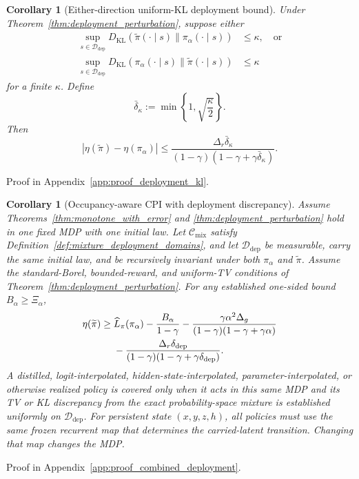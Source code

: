 \documentclass{article}
\theoremstyle{plain}
\newtheorem{corollary}[theorem]{Corollary}
\theoremstyle{definition}
\theoremstyle{remark}
\begin{document}
\begin{corollary}[Either-direction uniform-KL deployment bound]
\label{cor:deployment_pinsker}
Under Theorem~\ref{thm:deployment_perturbation}, suppose either
\begin{align*}
\sup_{s\in\mathcal D_{\mathrm{dep}}}
D_{\mathrm{KL}}\!\left(
\widetilde\pi(\cdot\mid s)\|\pi_\alpha(\cdot\mid s)\right)
&\le\kappa,
\quad\text{or}\\
\sup_{s\in\mathcal D_{\mathrm{dep}}}
D_{\mathrm{KL}}\!\left(
\pi_\alpha(\cdot\mid s)\|\widetilde\pi(\cdot\mid s)\right)
&\le\kappa
\end{align*}
for a finite $\kappa$. Define
\begin{equation}
\bar\delta_\kappa:=\min\left\{1,\sqrt{\frac{\kappa}{2}}\right\}.
\label{eq:deployment_pinsker_radius}
\end{equation}
Then
\begin{equation}
\left|\eta(\widetilde\pi)-\eta(\pi_\alpha)\right|
\le
\frac{\Delta_r\bar\delta_\kappa}
{(1-\gamma)(1-\gamma+\gamma\bar\delta_\kappa)}.
\label{eq:deployment_kl_bound}
\end{equation}
\end{corollary}
Proof in Appendix~\ref{app:proof_deployment_kl}.

\begin{corollary}[Occupancy-aware CPI with deployment discrepancy]
\label{cor:combined_cpi_deployment}
Assume Theorems~\ref{thm:monotone_with_error} and
\ref{thm:deployment_perturbation} hold in one fixed MDP with one initial law.
Let $\mathcal C_{\mathrm{mix}}$ satisfy
Definition~\ref{def:mixture_deployment_domains}, and let
$\mathcal D_{\mathrm{dep}}$ be measurable, carry the same initial law, and
be recursively invariant under both $\pi_\alpha$ and $\widetilde\pi$.
Assume the standard-Borel, bounded-reward, and uniform-TV conditions of
Theorem~\ref{thm:deployment_perturbation}. For any established one-sided
bound $B_\alpha\ge\Xi_\alpha$,
\begin{align}
\eta(\widetilde\pi)
\ge{}&
\widehat L_\pi(\pi_\alpha)
-\frac{B_\alpha}{1-\gamma}
-\frac{\gamma\alpha^2\Delta_g}
{(1-\gamma)(1-\gamma+\gamma\alpha)}
\notag\\
&-
\frac{\Delta_r\delta_{\mathrm{dep}}}
{(1-\gamma)(1-\gamma+\gamma\delta_{\mathrm{dep}})}.
\label{eq:combined_cpi_deployment}
\end{align}
A distilled, logit-interpolated, hidden-state-interpolated,
parameter-interpolated, or otherwise realized policy is covered only when it
acts in this same MDP and its TV or KL discrepancy from the exact
probability-space mixture is established uniformly on
$\mathcal D_{\mathrm{dep}}$. For persistent state $(x,y,z,h)$, all policies
must use the same frozen recurrent map that determines the carried-latent
transition. Changing that map changes the MDP.
\end{corollary}
Proof in Appendix~\ref{app:proof_combined_deployment}.
\end{document}
